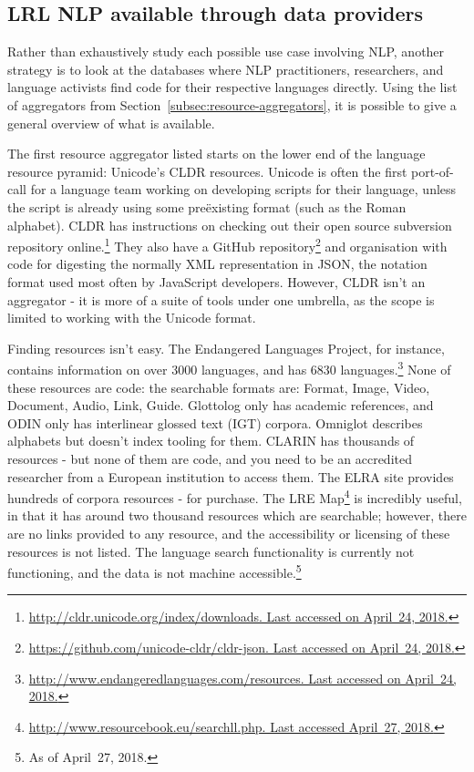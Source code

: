 \subsection{LRL NLP available through data providers}
\label{subsec:lrl-nlp-through-providers}

Rather than exhaustively study each possible use case involving NLP, another strategy is to look at the databases where NLP practitioners, researchers, and language activists find code for their respective languages directly. Using the list of aggregators from Section~\ref{subsec:resource-aggregators}, it is possible to give a general overview of what is available.

The first resource aggregator listed starts on the lower end of the language resource pyramid: Unicode's CLDR resources. Unicode is often the first port-of-call for a language team working on developing scripts for their language, unless the script is already using some  pre\"{e}xisting format (such as the Roman alphabet). CLDR has instructions on checking out their open source subversion repository online.\footnote{\href{http://cldr.unicode.org/index/downloads}{http://cldr.unicode.org/index/downloads. Last accessed on April~24, 2018.}} They also have a GitHub repository\footnote{\href{https://github.com/unicode-cldr/cldr-json}{https://github.com/unicode-cldr/cldr-json. Last accessed on April~24, 2018.}} and organisation with code for digesting the normally XML representation in JSON, the notation format used most often by JavaScript developers. However, CLDR isn't an aggregator - it is more of a suite of tools under one umbrella, as the scope is limited to working with the Unicode format.

Finding resources isn't easy. The Endangered Languages Project, for instance, contains information on over 3000 languages, and has 6830 languages.\footnote{\href{http://www.endangeredlanguages.com/resources/}{http://www.endangeredlanguages.com/resources. Last accessed on April~24, 2018.}} None of these resources are code: the searchable formats are: Format, Image, Video, Document, Audio, Link, Guide. Glottolog only has academic references, and ODIN only has interlinear glossed text (IGT) corpora. Omniglot describes alphabets but doesn't index tooling for them. CLARIN has thousands of resources - but none of them are code, and you need to be an accredited researcher from a European institution to access them. The ELRA site provides hundreds of corpora resources - for purchase. The LRE Map\footnote{\href{http://www.resourcebook.eu/searchll.php}{http://www.resourcebook.eu/searchll.php. Last accessed April~27, 2018.}} is incredibly useful, in that it has around two thousand resources which are searchable; however, there are no links provided to any resource, and the accessibility or licensing of these resources is not listed. The language search functionality is currently not functioning, and the data is not machine accessible.\footnote{As of April~27, 2018.}

